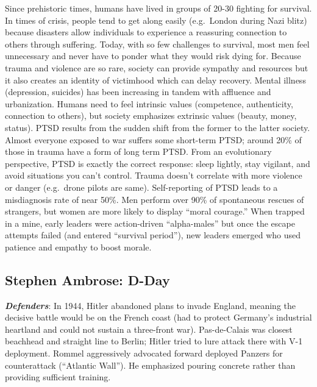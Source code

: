 \documentclass[
]{article}
\begin{document}
Since prehistoric times, humans have lived in groups of 20-30 fighting
for survival. In times of crisis, people tend to get along easily
(e.g.~London during Nazi blitz) because disasters allow individuals to
experience a reassuring connection to others through suffering. Today,
with so few challenges to survival, most men feel unnecessary and never
have to ponder what they would risk dying for. Because trauma and
violence are so rare, society can provide sympathy and resources but it
also creates an identity of victimhood which can delay recovery. Mental
illness (depression, suicides) has been increasing in tandem with
affluence and urbanization. Humans need to feel intrinsic values
(competence, authenticity, connection to others), but society emphasizes
extrinsic values (beauty, money, status). PTSD results from the sudden
shift from the former to the latter society. Almost everyone exposed to
war suffers some short-term PTSD; around 20\% of those in trauma have a
form of long term PTSD. From an evolutionary perspective, PTSD is
exactly the correct response: sleep lightly, stay vigilant, and avoid
situations you can't control. Trauma doesn't correlate with more
violence or danger (e.g.~drone pilots are same). Self-reporting of PTSD
leads to a misdiagnosis rate of near 50\%. Men perform over 90\% of
spontaneous rescues of strangers, but women are more likely to display
``moral courage.'' When trapped in a mine, early leaders were
action-driven ``alpha-males'' but once the escape attempts failed (and
entered ``survival period''), new leaders emerged who used patience and
empathy to boost morale.

\hypertarget{stephen-ambrose-d-day}{%
\subsection{Stephen Ambrose: D-Day}\label{stephen-ambrose-d-day}}

\textbf{\emph{Defenders}}: In 1944, Hitler abandoned plans to invade
England, meaning the decisive battle would be on the French coast (had
to protect Germany's industrial heartland and could not sustain a
three-front war). Pas-de-Calais was closest beachhead and straight line
to Berlin; Hitler tried to lure attack there with V-1 deployment. Rommel
aggressively advocated forward deployed Panzers for counterattack
(``Atlantic Wall''). He emphasized pouring concrete rather than
providing sufficient training.
\end{document}
